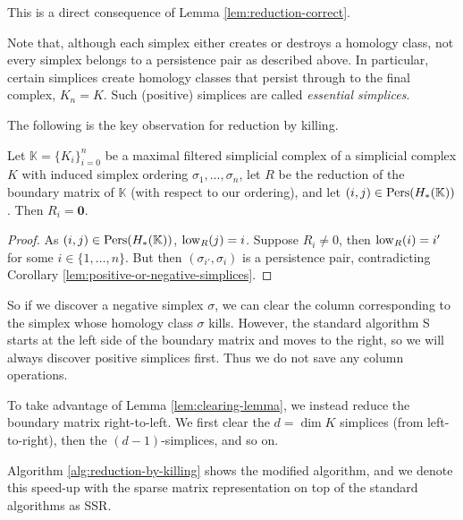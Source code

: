 This is a direct consequence of Lemma \ref{lem:reduction-correct}.

Note that, although each simplex either creates or destroys a homology class, not every simplex belongs to a persistence pair as described above. In particular, certain simplices create homology classes that persist through to the final complex, $K_n = K$. Such (positive) simplices are called \emph{essential simplices}.

The following is the key observation for reduction by killing.

\begin{lemma} \label{lem:clearing-lemma}
  Let $\mathbb K = \{K_i\}_{i=0}^n$ be a maximal filtered simplicial complex of a simplicial complex $K$ with induced simplex ordering $\sigma_1, \ldots, \sigma_n$, let $R$ be the reduction of the boundary matrix of $\mathbb K$ (with respect to our ordering), and let $(i, j) \in \operatorname{Pers}(H_*(\mathbb K))$. Then $R_i = \bm 0$. 
\end{lemma}

\begin{proof}
  As $(i, j) \in \operatorname{Pers}(H_*(\mathbb K))$, $\operatorname{low}_R(j) = i$. Suppose $R_i \neq 0$, then $\operatorname{low}_R(i) = i'$ for some $i \in \{1, \ldots, n\}$. But then $(\sigma_{i'}, \sigma_i)$ is a persistence pair, contradicting Corollary \ref{lem:positive-or-negative-simplices}.
\end{proof}

So if we discover a negative simplex $\sigma$, we can clear the column corresponding to the simplex whose homology class $\sigma$ kills. However, the standard algorithm \textsc{S} starts at the left side of the boundary matrix and moves to the right, so we will always discover positive simplices first. Thus we do not save any column operations. 

To take advantage of Lemma \ref{lem:clearing-lemma}, we instead reduce the boundary matrix right-to-left. We first clear the $d = \dim K$ simplices (from left-to-right), then the $(d-1)$-simplices, and so on. 

Algorithm \ref{alg:reduction-by-killing} shows the modified algorithm, and we denote this speed-up with the sparse matrix representation on top of the standard algorithms as \textsc{SSR}.

